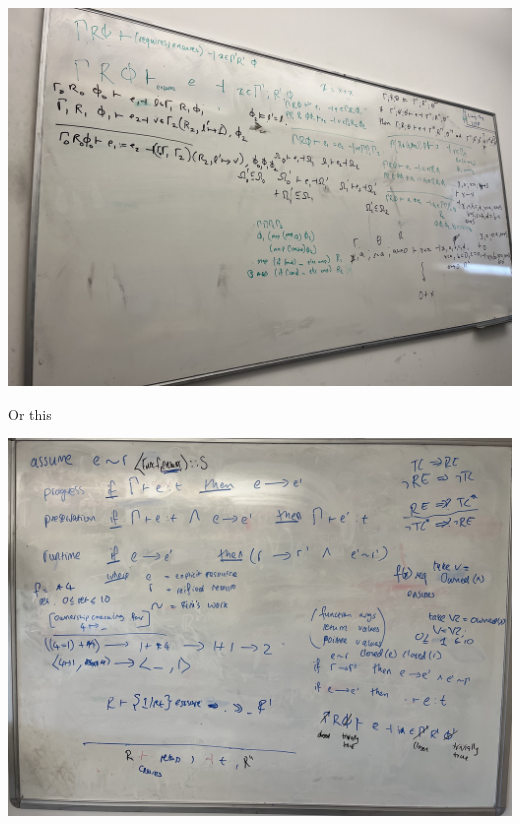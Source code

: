 \includegraphics{../misc/minicn-soundness}

Or this

\includegraphics{../misc/runtime-correctness}

